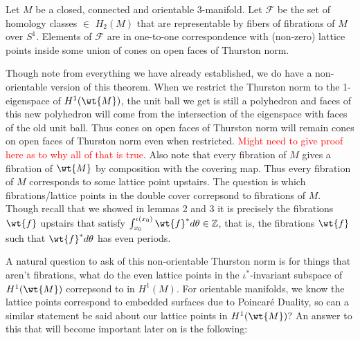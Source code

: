 \begin{thm}[Thurston]
Let $M$ be a closed, connected and orientable 3-manifold. Let $\mathcal{F}$ be the set of homology classes $\in$ $H_2(M)$ that are representable by fibers of fibrations of $M$ over $S^1$. Elements of $\mathcal{F}$ are in one-to-one correspondence with (non-zero) lattice points inside some union of cones on open faces of Thurston norm.
\end{thm}

Though note from everything we have already established, we do have a non-orientable version of this theorem. When we restrict the Thurston norm to the 1-eigenspace of $H^1(\wt{M})$, the unit ball we get is still a polyhedron and faces of this new polyhedron will come from the intersection of the eigenspace with faces of the old unit ball. Thus cones on open faces of Thurston norm will remain cones on open faces of Thurston norm even when restricted. \textcolor{red}{Might need to give proof here as to why all of that is true}. Also note that every fibration of $M$ gives a fibration of $\wt{M}$ by composition with the covering map. Thus every fibration of $M$ corresponds to some lattice point upstairs. The question is which fibrations/lattice points in the double cover correpsond to fibrations of $M$. Though recall that we showed in lemmas 2 and 3 it is precisely the fibrations $\wt{f}$ upstairs that satisfy $\int_{x_0}^{\iota(x_0)} \wt{f}^*d\theta \in \mathbb{Z}$, that is, the fibrations $\wt{f}$ such that $\wt{f}^*d\theta$ has even periods.

A natural question to ask of this non-orientable Thurston norm is for things that aren't fibrations, what do the even lattice points in the $\iota^*$-invariant subspace of $H^1(\wt{M})$ correpsond to in $H^1(M)$. For orientable manifolds, we know the lattice points correspond to embedded surfaces due to Poincar\'e Duality, so can a similar statement be said about our lattice points in $H^1(\wt{M})$? An answer to this that will become important later on is the following:

